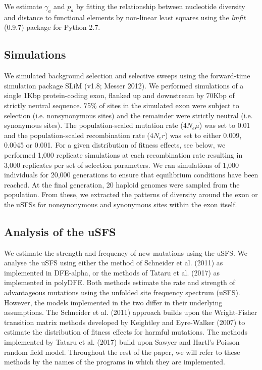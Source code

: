 \documentclass{article}
\begin{document}
	We estimate $\gamma_a$ and $p_a$ by fitting the relationship between nucleotide diversity and distance to functional elements by non-linear least squares using the \emph{lmfit} (0.9.7) package for Python 2.7.
 
	\subsection*{Simulations}
	We simulated background selection and selective sweeps using the forward-time simulation package SLiM (v1.8; Messer 2012). We performed simulations of a single 1Kbp protein-coding exon, flanked up and downstream by 70Kbp of strictly neutral sequence. 75\% of sites in the simulated exon were subject to selection (i.e. nonsynonymous sites) and the remainder were strictly neutral (i.e. synonymous sites). The population-scaled mutation rate (\emph{$4N_{e}\mu$}) was set to 0.01 and the population-scaled recombination rate (\emph{$4N_{e}r$}) was set to either 0.009, 0.0045 or 0.001. For a given distribution of fitness effects, see below, we performed 1,000 replicate simulations at each recombination rate resulting in 3,000 replicates per set of selection parameters. We ran simulations of 1,000 individuals for 20,000 generations to ensure that equilibrium conditions have been reached. At the final generation, 20 haploid genomes were sampled from the population. From these, we extracted the patterns of diversity around the exon or the uSFSs for nonsynonymous and synonymous sites within the exon itself.


	\subsection*{Analysis of the uSFS}

	We estimate the strength and frequency of new mutations using the uSFS. We analyse the uSFS using either the method of Schneider et al. (2011) as implemented in DFE-alpha, or the methods of Tataru et al. (2017) as implemented in polyDFE. Both methods estimate the rate and strength of advantageous mutations using the unfolded site frequency spectrum (uSFS). However, the models implemented in the two differ in their underlying assumptions. The Schneider et al. (2011) approach builds upon the Wright-Fisher transition matrix methods developed by Keightley and Eyre-Walker (2007) to estimate the distribution of fitness effects for harmful mutations. The methods implemented by Tataru et al. (2017) build upon Sawyer and Hartl’s Poisson random field model.
Throughout the rest of the paper, we will refer to these methods by the names of the programs in which they are implemented.
\end{document}
